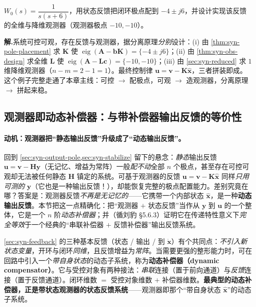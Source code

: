 \begin{example}
\label{ex:syn-full}
$W_0(s)=\dfrac{1}{s(s+6)}$，用状态反馈把闭环极点配到 $-4\pm j6$，并设计实现该反馈的全维与降维观测器（观测器极点 $-10,-10$）\cite{liubao2006modern}。

\textbf{解.}\;系统可控可观，存在反馈与观测器，据分离原理\emph{分别}设计：(i) 由 \cref{thm:syn-pole-placement} 求 $\mathbf K$ 使 $\operatorname{eig}(\mathbf A-\mathbf b\mathbf K)=\{-4\pm j6\}$；(ii) 由 \cref{thm:syn-obs-design} 求全维 $\mathbf L$ 使 $\operatorname{eig}(\mathbf A-\mathbf L\mathbf c)=\{-10,-10\}$；(iii) 由 \cref{sec:syn-reduced} 求 $1$ 维降维观测器（$n-m=2-1=1$）。最终控制律 $\mathbf u=\mathbf v-\mathbf K\hat{\mathbf x}$，三者拼装即成。这个例子完整走通了本章主线：可控 $\to$ 配极点，可观 $\to$ 造观测器，分离原理 $\to$ 拼起来稳。
\end{example}

\subsection{观测器即动态补偿器：与带补偿器输出反馈的等价性}
\label{sec:syn-compensator}

\paragraph{动机：观测器把“静态输出反馈”升级成了“动态输出反馈”。}
回到 \cref{sec:syn-output-pole,sec:syn-stabilize} 留下的悬念：\emph{静态}输出反馈 $\mathbf u=\mathbf v-\mathbf H\mathbf y$（无记忆、增益为常阵）一般\emph{配不动}全部 $n$ 个极点，甚至存在可控可观却无法被任何静态 $\mathbf H$ 镇定的系统。可基于观测器的反馈 $\mathbf u=\mathbf v-\mathbf K\hat{\mathbf x}$ 同样\emph{只用可测的} $\mathbf y$（它也是一种输出反馈！），却能恢复完整的极点配置能力。差别究竟在哪？答案是：观测器反馈\emph{不再是无记忆的}——它携带一个内部状态 $\hat{\mathbf x}$，是一种\textbf{动态输出反馈}。本节把这一点精确化：把“观测器 $+$ 状态反馈”当作从 $\mathbf y$ 到 $\mathbf u$ 的一个整体，它是一个 $n$ 阶\emph{动态补偿器}；并（循刘豹 §5.6.3）证明它在传递特性意义下\emph{完全等效}于一个经典的“串联补偿器 $+$ 反馈补偿器”输出反馈系统。

\begin{definition}[动态补偿器]
\label{def:syn-dyn-comp}
\cref{sec:syn-feedback} 的三种基本反馈（状态 / 输出 / 到 $\dot{\mathbf x}$）有个共同点：\emph{不引入新状态变量}，开环与闭环\emph{同维}，且反馈增益为\emph{常阵}。当需要更强的整形能力时，可在回路中引入一个\emph{带自身状态}的动态子系统，称为\textbf{动态补偿器（dynamic compensator）}\cite{liubao2006modern}。它与受控对象有两种接法：\emph{串联}连接（置于前向通道）与\emph{反馈}连接（置于反馈通道）。闭环维数 $=$ 受控对象维数 $+$ 补偿器维数。\textbf{最典型的动态补偿器，正是带状态观测器的状态反馈系统}——观测器即那个“带自身状态 $\hat{\mathbf x}$”的动态子系统。
\end{definition}

